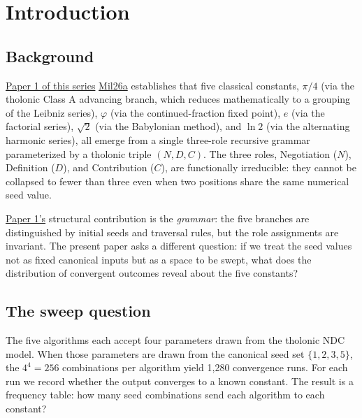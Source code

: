 \documentclass[12pt]{article}
\begin{document}
\section{Introduction}\label{introduction}

\subsection{Background}\label{background}

\href{https://github.com/baardev/truevalue/blob/main/docnav/Research/papers/1_recursive-tholonic-five-constants/1_recursive-tholonic-five-constants.pdf}{Paper
1 of this series}
\href{https://github.com/baardev/truevalue/blob/main/docnav/Research/papers/1_recursive-tholonic-five-constants/1_recursive-tholonic-five-constants.pdf}{Mil26a}
establishes that five classical constants, \(\pi/4\) (via the tholonic
Class A advancing branch, which reduces mathematically to a grouping of
the Leibniz series), \(\varphi\) (via the continued-fraction fixed
point), \(e\) (via the factorial series), \(\sqrt{2}\) (via the
Babylonian method), and \(\ln 2\) (via the alternating harmonic series),
all emerge from a single three-role recursive grammar parameterized by a
tholonic triple \((N, D, C)\). The three roles, Negotiation (\(N\)),
Definition (\(D\)), and Contribution (\(C\)), are functionally
irreducible: they cannot be collapsed to fewer than three even when two
positions share the same numerical seed value.

\href{https://github.com/baardev/truevalue/blob/main/docnav/Research/papers/1_recursive-tholonic-five-constants/1_recursive-tholonic-five-constants.pdf}{Paper
1's} structural contribution is the \emph{grammar}: the five branches
are distinguished by initial seeds and traversal rules, but the role
assignments are invariant. The present paper asks a different question:
if we treat the seed values not as fixed canonical inputs but as a space
to be swept, what does the distribution of convergent outcomes reveal
about the five constants?

\subsection{The sweep question}\label{the-sweep-question}

The five algorithms each accept four parameters drawn from the tholonic
NDC model. When those parameters are drawn from the canonical seed set
\(\{1, 2, 3, 5\}\), the \(4^4 = 256\) combinations per algorithm yield
1,280 convergence runs. For each run we record whether the output
converges to a known constant. The result is a frequency table: how many
seed combinations send each algorithm to each constant?
\end{document}
